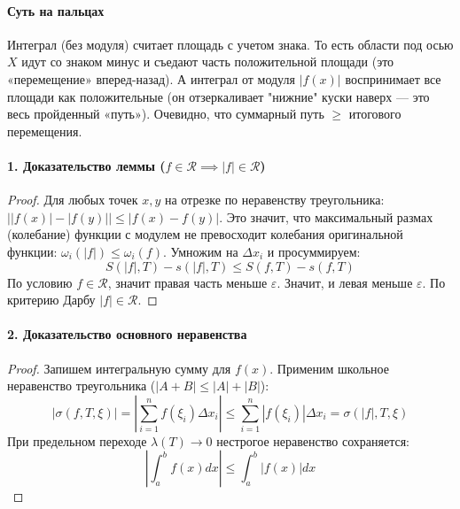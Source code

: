 \paragraph{Суть на пальцах}
Интеграл (без модуля) считает площадь с учетом знака. То есть области под осью $X$ идут со знаком минус и съедают часть положительной площади (это «перемещение» вперед-назад). А интеграл от модуля $|f(x)|$ воспринимает все площади как положительные (он отзеркаливает "нижние" куски наверх — это весь пройденный «путь»). Очевидно, что суммарный путь $\ge$ итогового перемещения.

\vspace{0.5em}
\begin{center}
\end{center}
\vspace{0.5em}

\paragraph{1. Доказательство леммы ($f \in \mathcal{R} \implies |f| \in \mathcal{R}$)}
\begin{proof}
Для любых точек $x, y$ на отрезке по неравенству треугольника: $\big| |f(x)| - |f(y)| \big| \le |f(x) - f(y)|$.
Это значит, что максимальный размах (колебание) функции с модулем не превосходит колебания оригинальной функции: $\omega_i(|f|) \le \omega_i(f)$.
Умножим на $\Delta x_i$ и просуммируем:
$$ S(|f|, T) - s(|f|, T) \le S(f, T) - s(f, T) $$
По условию $f \in \mathcal{R}$, значит правая часть меньше $\varepsilon$. Значит, и левая меньше $\varepsilon$. По критерию Дарбу $|f| \in \mathcal{R}$.
\end{proof}

\paragraph{2. Доказательство основного неравенства}
\begin{proof}
Запишем интегральную сумму для $f(x)$. Применим школьное неравенство треугольника ($|A+B| \le |A|+|B|$):
$$ \left| \sigma(f, T, \xi) \right| = \left| \sum_{i=1}^n f(\xi_i)\Delta x_i \right| \le \sum_{i=1}^n |f(\xi_i)|\Delta x_i = \sigma(|f|, T, \xi) $$
При предельном переходе $\lambda(T) \to 0$ нестрогое неравенство сохраняется:
$$ \left| \int_a^b f(x) dx \right| \le \int_a^b |f(x)| dx $$
\end{proof}


